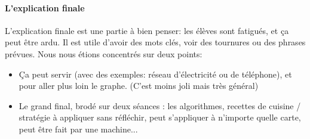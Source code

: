 \documentclass{article}
\begin{document}
	\paragraph{L'explication finale}
	L'explication finale est une partie à bien penser: les élèves sont fatigués, et
	ça peut être ardu. Il est utile d'avoir des mots clés, voir des tournures ou 
	des phrases prévues. Nous nous étions concentrés sur deux points:
	\begin{itemize}
	\item Ça peut servir (avec des exemples: réseau d'électricité ou de téléphone), 
	et pour aller plus loin le graphe. (C'est moins joli mais très général)
	\item Le grand final, brodé sur deux séances : les algorithmes, recettes de cuisine
	/ stratégie à appliquer sans réfléchir, peut s'appliquer à n'importe quelle carte, 
	peut être fait par une machine... 
	\end{itemize}


	
\end{document}
